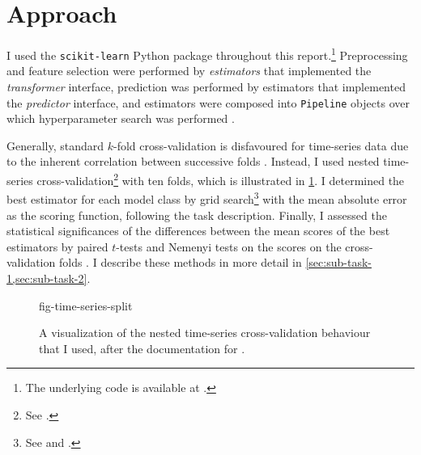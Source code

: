 \section{Approach}
\label{sec:approach}

I used the \texttt{scikit-learn} Python package \parencite{Pedregosa2011} throughout
this report.\footnote{The underlying code is available at
  .} Preprocessing and
feature selection were performed by \emph{estimators} that implemented the
\emph{transformer} interface, prediction was performed by estimators that implemented
the \emph{predictor} interface, and estimators were composed into \texttt{Pipeline}
objects over which hyperparameter search was performed \parencite[4-9]{Buitinck2013}.

Generally, standard $k$-fold cross-validation is disfavoured for time-series data due
to the inherent correlation between successive folds \parencite{Bergmeir2018}.
Instead, I used nested time-series cross-validation\footnote{See
  .} with ten folds, which is illustrated in
\cref{fig-cv}.
I determined the best estimator for each model class by grid search\footnote{See
   and
  .
} with the mean absolute error as the scoring function, following the task description.
Finally, I assessed the statistical significances of the differences between the mean
scores of the best estimators by paired $t$-tests and Nemenyi tests on the scores on
the cross-validation folds \parencite[353-354]{Flach2012}.
I describe these methods in more detail in \cref{sec:sub-task-1,sec:sub-task-2}.

\begin{figure}
  {fig-time-series-split}
  \caption{
    A visualization of the nested time-series cross-validation behaviour that I used,
    after the documentation for .
  }
  \label{fig-cv}
\end{figure}

